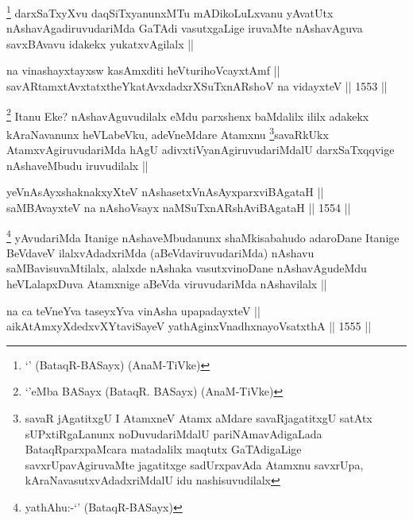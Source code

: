 \begin{artha}
\footnote{`\stext' (BataqR-BASayx) (AnaM-TiVke)}
darxSaTxyXvu daqSiTxyanunxMTu mADikoLuLxvanu yAvatUtx nAshavAgadiruvudariMda GaTAdi vasutxgaLige iruvaMte nAshavAguva savxBAvavu idakekx yukatxvAgilalx ||
\end{artha}

\begin{shl}
na vinashayxtayxsw kasAmxditi heVturihoVcayxtAmf || \\
savARtamxtAvxtatxtheYkatAvxdadxrXSuTxnARshoV na vidayxteV ||  1553 ||  
\end{shl}

\begin{artha}
\footnote{`\stext'eMba BASayx (BataqR. BASayx) (AnaM-TiVke)}
Itanu Eke? nAshavAguvudilalx eMdu parxshenx baMdalilx ililx adakekx kAraNavanunx heVLabeVku, adeVneMdare Atamxnu \footnote{savaR jAgatitxgU I AtamxneV Atamx aMdare savaRjagatitxgU satAtx sUPxtiRgaLanunx noDuvudariMdalU pariNAmavAdigaLada BataqRparxpaMcara matadalilx maqtutx GaTAdigaLige savxrUpavAgiruvaMte jagatitxge sadUrxpavAda Atamxnu savxrUpa, kAraNavasutxvAdadxriMdalU idu nashisuvudilalx}savaRkUkx AtamxvAgiruvudariMda hAgU adivxtiVyanAgiruvudariMdalU darxSaTxqqvige nAshaveMbudu iruvudilalx ||
\end{artha}


\begin{shl}
yeVnAsAyx\s \s shaknakxyXteV nAshasetxVnAsAyxparxviBAgataH || \\
saMBAvayxteV na nAshoV\s sayx naMSuTxnARshAviBAgataH ||  1554 ||  
\end{shl}

\begin{artha}
\footnote{yathAhu:-`\stext' (BataqR-BASayx)}
yAvudariMda Itanige nAshaveMbudanunx shaMkisabahudo adaroDane Itanige BeVdaveV ilalxvAdadxriMda (aBeVdaviruvudariMda) nAshavu saMBavisuvaMtilalx, alalxde nAshaka vasutxvinoDane nAshavAgudeMdu heVLalapxDuva Atamxnige aBeVda viruvudariMda nAshavilalx ||
\end{artha}


\begin{shl}
na ca teVneYva taseyxYva vinAsha upapadayxteV || \\
aikAtAmxyXdedxvXYtaviSayeV yathA\s ginxVnadhxnayoVsatxthA ||  1555 ||  
\end{shl}


